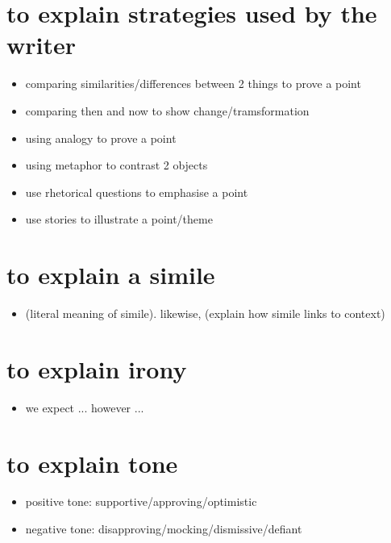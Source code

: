 \documentclass[a4paper]{article}
\begin{document}
\begin{CJK}{UTF8}{min}
\section{to explain strategies used by the writer}
\begin{itemize}
	\item comparing similarities/differences between 2 things to prove a point
	\item comparing then and now to show change/tramsformation
	\item using analogy to prove a point
	\item using metaphor to contrast 2 objects
	\item use rhetorical questions to emphasise a point
	\item use stories to illustrate a point/theme
\end{itemize}

\section{to explain a simile}
\begin{itemize}
	\item (literal meaning of simile). likewise, (explain how simile links to context)
\end{itemize}

\section{to explain irony}
\begin{itemize}
	\item we expect ... however ...
\end{itemize}
		
\section{to explain tone}
\begin{itemize}
	\item positive tone: supportive/approving/optimistic
	\item negative tone: disapproving/mocking/dismissive/defiant
\end{itemize}
\end{CJK}
\end{document}
